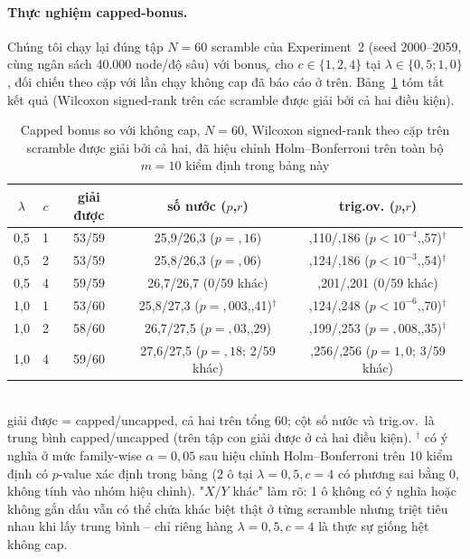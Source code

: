 \documentclass[10pt,conference]{article}
\begin{document}
\paragraph{Thực nghiệm capped-bonus.} Chúng tôi chạy lại đúng tập $N=60$
scramble của Experiment~2 (seed 2000--2059, cùng ngân sách
40.000 node/độ sâu) với $\mathrm{bonus}_c$ cho $c \in \{1, 2, 4\}$ tại
$\lambda \in \{0,5; 1,0\}$, đối chiếu theo cặp với lần chạy không cap đã
báo cáo ở trên. Bảng~\ref{tab:capped-bonus} tóm tắt kết quả (Wilcoxon
signed-rank trên các scramble được giải bởi cả hai điều kiện).
\begin{table}[h]
\centering
\footnotesize
\caption{Capped bonus so với không cap, $N=60$, Wilcoxon signed-rank
theo cặp trên scramble được giải bởi cả hai, đã hiệu chỉnh
Holm--Bonferroni trên toàn bộ $m=10$ kiểm định trong bảng này}
\label{tab:capped-bonus}
\begin{tabular}{ccccc}
\toprule
$\lambda$ & $c$ & giải được & số nước ($p$,$r$) & trig.ov. ($p$,$r$) \\
\midrule
0,5 & 1 & 53/59 & 25,9/26,3 ($p{=}{,}16$) & ,110/,186 ($p{<}10^{-4}$,,57)$^\dagger$ \\
0,5 & 2 & 53/59 & 25,8/26,3 ($p{=}{,}06$) & ,124/,186 ($p{<}10^{-3}$,,54)$^\dagger$ \\
0,5 & 4 & 59/59 & 26,7/26,7 (0/59 khác) & ,201/,201 (0/59 khác) \\
1,0 & 1 & 53/60 & 25,8/27,3 ($p{=}{,}003$,,41)$^\dagger$ & ,124/,248 ($p{<}10^{-6}$,,70)$^\dagger$ \\
1,0 & 2 & 58/60 & 26,7/27,5 ($p{=}{,}03$,,29) & ,199/,253 ($p{=}{,}008$,,35)$^\dagger$ \\
1,0 & 4 & 59/60 & 27,6/27,5 ($p{=}{,}18$; 2/59 khác) & ,256/,256 ($p{=}1{,}0$; 3/59 khác) \\
\bottomrule
\end{tabular}
\\[2pt]
{\scriptsize giải được = capped/uncapped, cả hai trên tổng 60; cột số
nước và trig.ov.\ là trung bình capped/uncapped (trên tập con giải
được ở cả hai điều kiện). $^\dagger$ có ý nghĩa ở mức family-wise
$\alpha=0,05$ sau hiệu chỉnh Holm--Bonferroni trên 10 kiểm định có
$p$-value xác định trong bảng (2 ô tại $\lambda{=}0,5,c{=}4$ có
phương sai bằng 0, không tính vào nhóm hiệu chỉnh). "$X/Y$ khác" làm
rõ: 1 ô không có ý nghĩa hoặc không gắn dấu vẫn có thể chứa khác biệt
thật ở từng scramble nhưng triệt tiêu nhau khi lấy trung bình -- chỉ
riêng hàng $\lambda{=}0,5,c{=}4$ là thực sự giống hệt không cap.}
\end{table}
\end{document}
